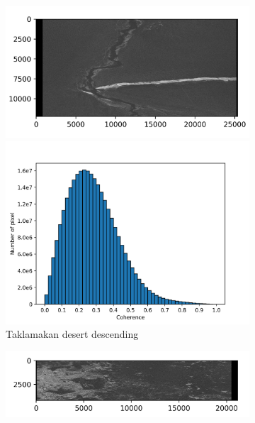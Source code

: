 \documentclass[preprint, authoryear]{elsarticle}
\begin{document}
\begin{figure}
\begin{subfigure}[c]{0.5\textwidth}
\begin{minipage}[c]{0.5\textwidth}
            \centering
            \includegraphics[width=\textwidth]{figure/The coherence/coh_TaklimakanDesert_des_esd1.png}
        \end{minipage}%
        \begin{minipage}[c]{0.5\textwidth}
            \centering
            \includegraphics[width=\textwidth]{figure/The coherence/coh_TaklimakanDesert_des_esd1_histogram_.png}
        \end{minipage}
        \caption{Taklamakan desert descending}
        \label{fig_6b}
    \end{subfigure}%
    \hfill
    \begin{subfigure}{0.5\textwidth}
        \centering
        \begin{minipage}{0.5\textwidth}
            \centering
            \includegraphics[width=\textwidth]{figure/The coherence/coh_Mexico_asc_esd1.png}

\end{minipage}
\end{subfigure}
\end{figure}
\end{document}

